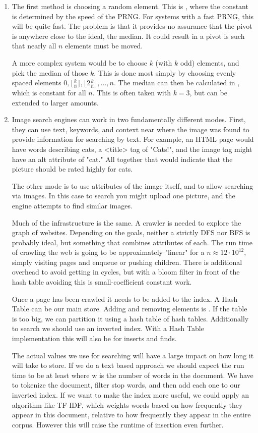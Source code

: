 \documentclass[12pt]{chmullighw}
\begin{document}
\begin{enumerate}
\item The first method is choosing a random element. This is , where the constant is determined by the speed of the PRNG. For systems with a fast PRNG, this will be quite fast. The problem is that it provides no assurance that the pivot is anywhere close to the ideal, the median. It could result in a pivot is such that nearly all $n$ elements must be moved.

A more complex system would be to choose $k$ (with $k$ odd) elements, and pick the median of those $k$. This is done most simply by choosing evenly spaced elements $0, \lfloor\frac{k}{n}\rfloor, \lfloor2\frac{k}{n}\rfloor, ..., n$. The median can then be calculated in , which is constant for all $n$. This is often taken with $k = 3$, but can be extended to larger amounts.


\item Image search engines can work in two fundamentally different modes. First, they can use text, keywords, and context near where the image was found to provide information for searching by text. For example, an HTML page would have words describing cats, a <title> tag of "Cats!", and the image tag might have an alt attribute of "cat." All together that would indicate that the picture should be rated highly for cats.

The other mode is to use attributes of the image itself, and to allow searching via images. In this case to search you might upload one picture, and the engine attempts to find similar images.

Much of the infrastructure is the same. A crawler is needed to explore the graph of websites. Depending on the goals, neither a strictly DFS nor BFS is probably ideal, but something that combines attributes of each. The run time of crawling the web is going to be approximately "linear" for a $n \approx 12\cdot10^{12}$, simply visiting pages and enqueue or pushing children. There is additional overhead to avoid getting in cycles, but with a bloom filter in front of the hash table avoiding this is small-coefficient constant work. 

Once a page has been crawled it needs to be added to the index. A Hash Table can be our main store. Adding and removing elements is . If the table is too big, we can partition it using a hash table of hash tables. Additionally to search we should use an inverted index. With a Hash Table implementation this will also be  for inserts and finds.

The actual values we use for searching will have a large impact on how long it will take to store. If we do a text based approach we should expect the run time to be at least  where w is the number of words in the document. We have to tokenize the document, filter stop words, and then add each one to our inverted index. If we want to make the index more useful, we could apply an algorithm like TF-IDF, which weights words based on how frequently they appear in this document, relative to how frequently they appear in the entire corpus. However this will raise the runtime of insertion even further.



\end{enumerate}
\end{document}
